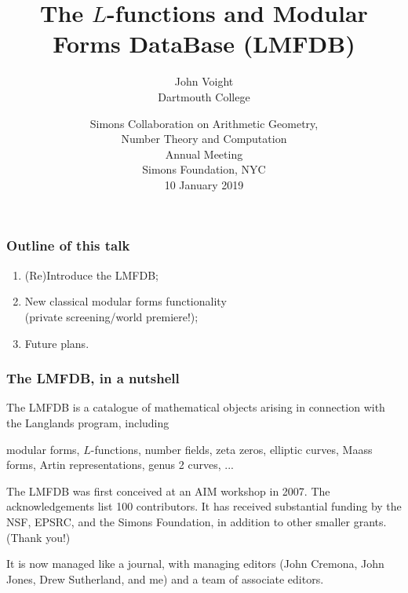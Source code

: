 \documentclass[xcolor=dvipsnames]{beamer}
\title{The $L$-functions and Modular Forms DataBase (LMFDB)}
\author{John Voight \\ Dartmouth College}
\date{Simons Collaboration on Arithmetic Geometry, \\
Number Theory and Computation \\ Annual Meeting \\ Simons Foundation, NYC \\ 10 January 2019}
\theoremstyle{plain}
\begin{document}
\begin{frame}[plain]
\titlepage
\end{frame}

\begin{frame}[plain]
\frametitle{Outline of this talk} \pause

\begin{enumerate}
\item (Re)Introduce the LMFDB;
\item New classical modular forms functionality \\ (private screening/world premiere!);
\item Future plans.
\end{enumerate}
 
\end{frame}

\begin{frame}[plain]
\frametitle{The LMFDB, in a nutshell} \pause

The LMFDB is a catalogue of mathematical objects arising in connection with the Langlands program, including  \pause 
\begin{center}
modular forms, $L$-functions, number fields, zeta zeros, elliptic curves, Maass forms, Artin representations, genus 2 curves, ... \pause
\end{center}

The LMFDB was first conceived at an AIM workshop in 2007.  \pause  The acknowledgements list 100 contributors.  \pause It has received substantial funding by the NSF, EPSRC, and the Simons Foundation, in addition to other smaller grants.  \pause  (Thank you!)   \pause

It is now managed like a journal, with managing editors (John Cremona, John Jones, Drew Sutherland, and me) and a team of associate editors.
\end{frame}
\end{document}
